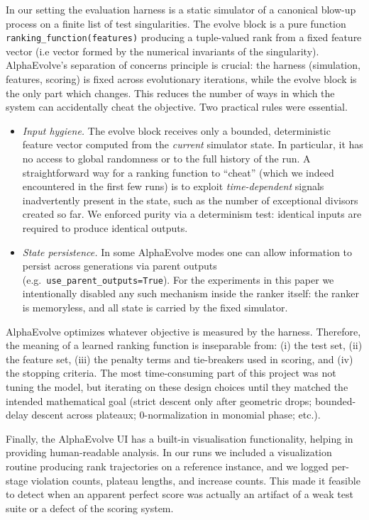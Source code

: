 \documentclass[11pt]{amsart}
\begin{document}
In our setting the evaluation harness is a static simulator of a canonical blow-up process on a finite list of test singularities.
The evolve block is a pure function \texttt{ranking\_function(features)} producing a tuple-valued rank from a fixed feature vector (i.e vector formed by the numerical invariants of the singularity).
AlphaEvolve's separation of concerns principle is crucial: the harness (simulation, features, scoring) is fixed across evolutionary iterations, while the evolve block is the only part which changes.
This reduces the number of ways in which the system can accidentally cheat the objective.
Two practical rules were essential.
\begin{itemize}
  \item \emph{Input hygiene.}
The evolve block receives only a bounded, deterministic feature vector computed from the \emph{current} simulator state. In particular, it has no access to global randomness or to the full history of the run. A straightforward way for a ranking function to ``cheat'' (which we indeed encountered in the first few runs) is to exploit \emph{time-dependent} signals inadvertently present in the state, such as the number of exceptional divisors created so far. We enforced purity via a determinism test: identical inputs are required to produce identical outputs.

\item \emph{State persistence.}
In some AlphaEvolve modes one can allow information to persist across generations via parent outputs (e.g.\ \texttt{use\_parent\_outputs=True}).
For the experiments in this paper we intentionally disabled any such mechanism inside the ranker itself: the ranker is memoryless, and all state is carried by the fixed simulator.

  \end{itemize}

AlphaEvolve optimizes whatever objective is measured by the harness.
Therefore, the meaning of a learned ranking function is inseparable from:
(i) the test set,
(ii) the feature set,
(iii) the penalty terms and tie-breakers used in scoring, and
(iv) the stopping criteria.
The most time-consuming part of this project was not tuning the model, but iterating on these design choices until they matched the intended mathematical goal (strict descent only after geometric drops; bounded-delay descent across plateaux; $0$-normalization in monomial phase; etc.).


Finally, the AlphaEvolve UI has a built-in visualisation functionality, helping in providing human-readable analysis. In our runs we included a visualization routine producing rank trajectories on a reference instance, and we logged per-stage violation counts, plateau lengths, and increase counts.
This made it feasible to detect when an apparent perfect score was actually an artifact of a weak test suite or a defect of the scoring system.
\end{document}
